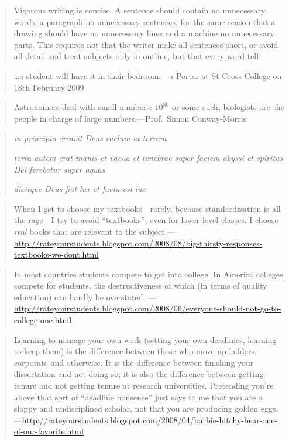 \documentclass[a4paper]{article}
\begin{document}
\medskip
\begin{quote}
	Vigorous writing is concise. A sentence should contain no
	unnecessary words, a paragraph no unnecessary sentences, for
	the same reason that a drawing should have no unnecessary lines
	and a machine no unnecessary parts. This requires not that the
	writer make all sentences short, or avoid all detail and treat
	subjects only in outline, but that every word
	tell.~\citep{Strunk1999a}
\end{quote}

\medskip
\begin{quote}
	\ldots a student will have it in their bedroom.---a Porter at
	St Cross College on 18th February 2009
\end{quote}

\medskip
\begin{quote}
	Astronomers deal with small numbers: $10^{80}$ or some such;
	biologists are the people in charge of large
	numbers.---Prof.~Simon Conway-Morris
\end{quote}

\medskip
\begin{quote}
	\emph{in principio creavit Deus caelum et terram}

	\emph{terra autem erat inanis et vacua et tenebrae super
		faciem abyssi et spiritus Dei ferebatur super aquas}

	\emph{dixitque Deus fiat lux et facta est lux}
\end{quote}

\medskip
\begin{quote}
	When I get to choose my textbooks---rarely, because standardization
	is all the rage---I try to avoid ``textbooks'', even for lower-level
	classes. I choose \emph{real} books that are relevant to the
	subject.---\url{http://rateyourstudents.blogspot.com/2008/08/big-thirsty-responses-textbooks-we-dont.html}
\end{quote}

\medskip
\begin{quote}
	In most countries students compete to get into college. In
	America colleges compete for students, the destructiveness of
	which (in terms of quality education) can hardly be overstated.
	---\url{http://rateyourstudents.blogspot.com/2008/06/everyone-should-not-go-to-college-one.html}
\end{quote}

\medskip
\begin{quote}
	Learning to manage your own work (setting your own deadlines,
	learning to keep them) is the difference between those who
	move up ladders, corporate and otherwise. It is the difference
	between finishing your dissertation and not doing so; it is also
	the difference between getting tenure and not getting tenure
	at research universities. Pretending you're above that sort of
	``deadline nonsense'' just says to me that you are a sloppy and
	undisciplined scholar, not that you are producing golden eggs.
	---\url{http://rateyourstudents.blogspot.com/2008/04/barbie-bitchy-bear-one-of-our-favorite.html}
\end{quote}
\end{document}
